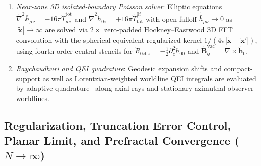 \documentclass[aps,prd,twocolumn,10pt,showkeys,nofootinbib,floatfix,longbibliography]{revtex4-2}
\begin{document}
\begin{enumerate}
\begin{align}
    \mathcal{G}_\varphi(\tilde{\omega}, \tilde{r}) &= \begin{cases} e^{i\sqrt{\tilde{\omega}^2 - \tilde{m}_\varphi^2}\,\tilde{r}}, & \tilde{\omega} > \tilde{m}_\varphi, \\ e^{-\sqrt{\tilde{m}_\varphi^2 - \tilde{\omega}^2}\,\tilde{r}}, & \tilde{\omega} \le \tilde{m}_\varphi, \end{cases}
    \label{eq:scalaron_retarded}
    \end{align}
    with canonical coupling $\alpha_\varphi = 1/\sqrt{6}$.
    \item \emph{Near-zone 3D isolated-boundary Poisson solver}: Elliptic equations $\tilde{\nabla}^2 \tilde{\bar{h}}_{\mu\nu} = -16\pi \tilde{T}_{\mu\nu}^{\mathrm{tot}}$ and $\tilde{\nabla}^2 \tilde{h}_{0i} = +16\pi \tilde{T}^{0i}_{\mathrm{tot}}$ with open falloff $\tilde{\bar{h}}_{\mu\nu} \to 0$ as $|\tilde{\mathbf{x}}| \to \infty$ are solved via $2\times$ zero-padded Hockney--Eastwood 3D FFT convolution with the spherical-equivalent regularized kernel $1/(4\pi|\tilde{\mathbf{x}}-\tilde{\mathbf{x}}'|)$, using fourth-order central stencils for $\tilde{R}_{0z0z} = -\frac{1}{2}\partial_{\tilde{z}}^2 \tilde{h}_{00}$ and $\tilde{\mathbf{B}}_g^{\mathrm{vac}} = \tilde{\nabla} \times \tilde{\mathbf{h}}_0$.
    \item \emph{Raychaudhuri and QEI quadrature}: Geodesic expansion shifts and compact-support as well as Lorentzian-weighted worldline QEI integrals are evaluated by adaptive quadrature~\cite{virtanen2020scipy} along axial rays and stationary azimuthal observer worldlines.
\end{enumerate}

\subsection{Regularization, Truncation Error Control, Planar Limit, and Prefractal Convergence \texorpdfstring{($N \to \infty$)}{(N -> infinity)}}
\label{subsec:convergence}
\end{document}
